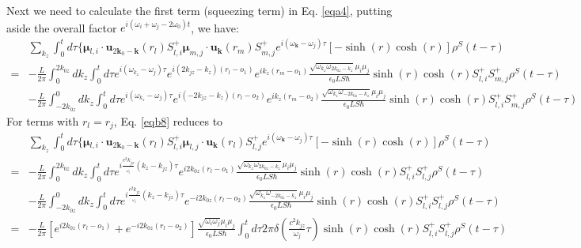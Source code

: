 \documentclass[aps,showpacs,twocolumn,twoside,groupedaddress]{revtex4}
\let\vec\bm
\begin{document}
\begin{widetext}
Next we need to calculate the first term (squeezing term) in Eq. \eqref{eqa4}, putting aside the overall factor $e^{i(\omega_i+\omega_j-2\omega_0)t}$, we have:
\begin{equation}
\label{eqb8}\tag{A7}
\begin{split}
& \underset{k_{z}}{\sum}\int_{0}^{t}d\tau\{\vec{\mu}{}_{l,i}\cdot\vec{u}_{2\vec{k}_{0}-\vec{k}}(r_{l})S_{l,i}^{+}\vec{\mu}_{m,j}\cdot\vec{u}_{\vec{k}}(r_{m})S_{m,j}^{+}e^{i(\omega_{\vec{k}}-\omega_{j})\tau}[-\sinh(r)\cosh(r)]\rho^{S}(t-\tau)\\
=&-\frac{L}{2\pi}\int_{0}^{2k_{0z}}dk_{z}\int_{0}^{t}d\tau e^{i(\omega_{k_{z}}-\omega_{j})\tau}e^{i(2k_{jz}-k_{z})(r_{l}-o_{1})}e^{ik_{z}(r_{m}-o_{1})}\frac{\sqrt{\omega_{k_{z}}\omega_{2k_{0z}-k_{z}}}\mu_{i}\mu_{j}}{\epsilon_{0}LS\hbar}\sinh(r)\cosh(r)S_{l,i}^{+}S_{m,j}^{+}\rho^{S}(t-\tau)\\ 
&-\frac{L}{2\pi}\int_{-2k_{0z}}^{0}dk_{z}\int_{0}^{t}d\tau e^{i(\omega_{k_{z}}-\omega_{j})\tau}e^{i(-2k_{jz}-k_{z})(r_{l}-o_{2})}e^{ik_{z}(r_{m}-o_{2})}\frac{\sqrt{\omega_{k_{z}}\omega_{-2k_{0z}-k_{z}}}\mu_{i}\mu_{j}}{\epsilon_{0}LS\hbar}\sinh(r)\cosh(r)S_{l,i}^{+}S_{m,j}^{+}\rho^{S}(t-\tau)
\end{split}
\end{equation}
For terms with $r_l=r_j$, Eq.  \eqref{eqb8} reduces to 
\begin{equation}
\label{eqb9}\tag{A8}
\begin{split}
&\underset{k_{z}}{\sum}\int_{0}^{t}d\tau\{\vec{\mu}{}_{l,i}\cdot\vec{u}_{2\vec{k}_{0}-\vec{k}}(r_{l})S_{l,i}^{+}\vec{\mu}_{l,j}\cdot\vec{u}_{\vec{k}}(r_{l})S_{l,j}^{+}e^{i(\omega_{\vec{k}}-\omega_{j})\tau}[-\sinh(r)\cosh(r)]\rho^{S}(t-\tau)\\
=&-\frac{L}{2\pi}\int_{0}^{2k_{0z}}dk_{z}\int_{0}^{t}d\tau e^{i\frac{c^{2}k_{jz}}{_{\omega_{j}}}(k_{z}-k_{jz})\tau}e^{i2k_{0z}(r_{l}-o_{1})}\frac{\sqrt{\omega_{k_{z}}\omega_{2k_{0z}-k_{z}}}\mu_{i}\mu_{j}}{\epsilon_{0}LS\hbar}\sinh(r)\cosh(r)S_{l,i}^{+}S_{l,j}^{+}\rho^{S}(t-\tau)\\
&-\frac{L}{2\pi}\int_{-2k_{0z}}^{0}dk_{z}\int_{0}^{t}d\tau e^{i\frac{c^{2}k_{jz}}{_{\omega_{j}}}(k_{z}-k_{jz})\tau}e^{-i2k_{0z}(r_{l}-o_{2})}\frac{\sqrt{\omega_{k_{z}}\omega_{-2k_{0z}-k_{z}}}\mu_{i}\mu_{j}}{\epsilon_{0}LS\hbar}\sinh(r)\cosh(r)S_{l,i}^{+}S_{l,j}^{+}\rho^{S}(t-\tau)\\
=&-\frac{L}{2\pi}[e^{i2k_{0z}(r_{l}-o_{1})}+e^{-i2k_{0z}(r_{l}-o_{2})}]\frac{\sqrt{\omega_{i}\omega_{j}}\mu_{i}\mu_{j}}{\epsilon_{0}LS\hbar}\int_{0}^{t}d\tau2\pi\delta(\frac{c^{2}k_{jz}}{\omega_{j}}\tau)\sinh(r)\cosh(r)S_{l,i}^{+}S_{l,j}^{+}\rho^{S}(t-\tau)\\

\end{split}
\end{equation}
\end{widetext}
\end{document}
